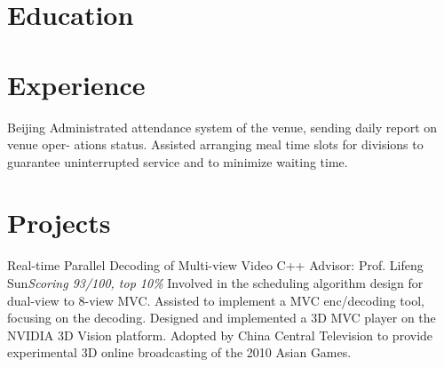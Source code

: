 \documentclass[11pt,a4paper]{moderncv}
\begin{document}
\maketitle

\section{Education}


\section{Experience}
{Beijing}{}
{
Administrated attendance system of the venue, sending daily report on venue oper- ations status.
Assisted arranging meal time slots for divisions to guarantee uninterrupted service and to minimize waiting time.
}


\section{Projects}

{Real-time Parallel Decoding of Multi-view Video}
{C++}
{Advisor: Prof. Lifeng Sun}{\textit{Scoring 93/100, top 10\%}}
{
Involved in the scheduling algorithm design for dual-view to 8-view MVC.
Assisted to implement a MVC enc/decoding tool, focusing on the decoding.
Designed and implemented a 3D MVC player on the NVIDIA 3D Vision platform.
Adopted by China Central Television to provide experimental 3D online broadcasting of the 2010 Asian Games.
}
\end{document}
